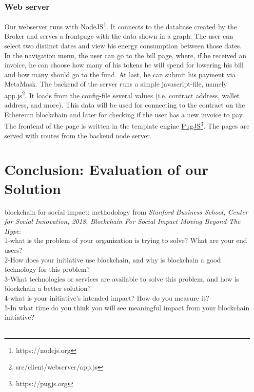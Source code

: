 \documentclass[11pt]{article}
\begin{document}
\subsubsection{Web server}
Our webserver runs with NodeJS\footnote{https://nodejs.org}. It connects to the database created by the Broker and serves a frontpage with the data shown in a graph. The user can select two distinct dates and view his energy consumption between those dates. In the navigation menu, the user can go to the bill page, where, if he received an invoice, he can choose how many of his tokens he will spend for lowering his bill and how many should go to the fund. At last, he can submit his payment via MetaMask. The backend of the server runs a simple javascript-file, namely app.js\footnote{src/client/webserver/app.js}. It loads from the config-file several values (i.e. contract address, wallet address, and more). This data will be used for connecting to the contract on the Ethereum blockchain and later for checking if the user has a new invoice to pay. The frontend of the page is written in the template engine \hyperref[https://pugjs.org]{PugJS}\footnote{https://pugjs.org}. The pages are served with routes from the backend node server.

\section{Conclusion: Evaluation of our Solution}
\color{red}
blockchain for social impact: methodology from \textit{Stanford Business School, Center for Social Innovation, 2018, Blockchain For Social Impact Moving Beyond The Hype}:\\
1-what is the problem of your organization is trying to solve? What are your end users?\\
2-How does your initiative use blockchain, and why is blockchain a good technology for this problem?\\
3-What technologies or services are available to solve this problem, and how is blockchain a better solution?\\
4-what is your initiative's intended impact? How do you measure it?\\
5-In what time do you think you will see meaningful impact from your blockchain initiative?\\\\
\color{black}
\end{document}
